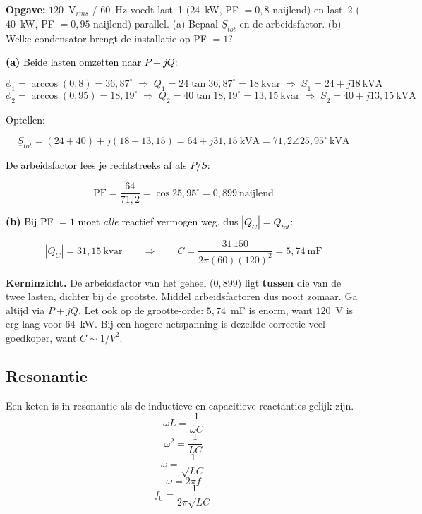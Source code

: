 \documentclass[a4paper,11pt]{article}
\newcommand{\stapreden}[1]{\par\vspace{1.4mm}\noindent\textcolor{black}{#1}\par\vspace{-2mm}}
\begin{document}
\begin{oefening}
    \textbf{Opgave:} $120$~V$_{rms}$ / $60$~Hz voedt last~1 ($24$~kW, PF $=0{,}8$ naijlend) en
    last~2 ($40$~kW, PF $=0{,}95$ naijlend) parallel. (a) Bepaal $\underline{S}_{tot}$ en de
    arbeidsfactor. (b) Welke condensator brengt de installatie op PF $=1$?

    \stapreden{\textbf{(a)} Beide lasten omzetten naar $P+jQ$:}
    \[\phi_1 = \arccos(0{,}8) = 36{,}87^\circ \;\Rightarrow\; Q_1 = 24\tan 36{,}87^\circ = 18\ \text{kvar}
        \;\Rightarrow\; \underline{S}_1 = 24 + j18\ \text{kVA}\]
    \[\phi_2 = \arccos(0{,}95) = 18{,}19^\circ \;\Rightarrow\; Q_2 = 40\tan 18{,}19^\circ = 13{,}15\ \text{kvar}
        \;\Rightarrow\; \underline{S}_2 = 40 + j13{,}15\ \text{kVA}\]

    \stapreden{Optellen:}
    \[\underline{S}_{tot} = (24+40) + j(18+13{,}15) = \boxed{64 + j31{,}15\ \text{kVA}}
        = 71{,}2\angle 25{,}95^\circ\ \text{kVA}\]

    \stapreden{De arbeidsfactor lees je rechtstreeks af als $P/S$:}
    \[\text{PF} = \frac{64}{71{,}2} = \cos 25{,}95^\circ = \boxed{0{,}899\ \text{naijlend}}\]

    \stapreden{\textbf{(b)} Bij PF $=1$ moet \emph{alle} reactief vermogen weg, dus $|Q_C| = Q_{tot}$:}
    \[|Q_C| = 31{,}15\ \text{kvar}
        \qquad\Longrightarrow\qquad
        C = \frac{31\,150}{2\pi(60)(120)^2} = \boxed{5{,}74\ \text{mF}}\]

    \textbf{Kerninzicht.} De arbeidsfactor van het geheel ($0{,}899$) ligt \textbf{tussen} die van de
    twee lasten, dichter bij de grootste. Middel arbeidsfactoren dus nooit zomaar. Ga altijd via
    $P+jQ$. Let ook op de grootte-orde: $5{,}74$~mF is enorm, want $120$~V is erg laag voor $64$~kW.
    Bij een hogere netspanning is dezelfde correctie veel goedkoper, want $C \sim 1/V^2$.
\end{oefening}


\subsection{Resonantie}\label{sec:resonantie-C}
Een keten is in resonantie als de inductieve en capacitieve reactanties gelijk zijn.
\[\omega L = \frac{1}{\omega C}\]
\[\omega^2 = \frac{1}{LC}\]
\[\omega = \frac{1}{\sqrt{LC}}\]
\[\omega = 2 \pi f\]
\[\boxed{f_0 = \frac{1}{2\pi \sqrt{LC}}}\]

\end{document}
